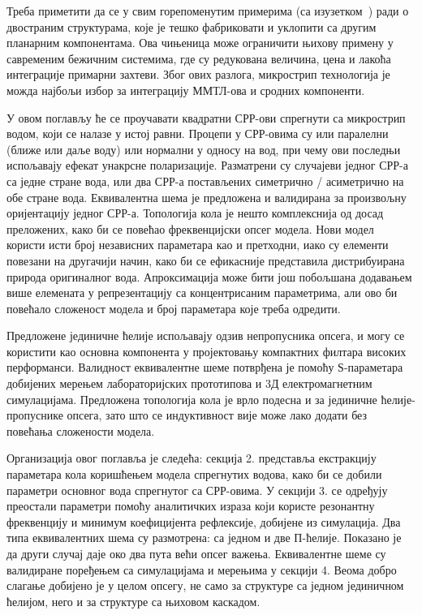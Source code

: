 Треба приметити да се у свим горепоменутим примерима (са изузетком~\cite{bib16}) ради о двостраним структурама, које је тешко фабриковати и уклопити са другим планарним компонентама. Ова чињеница може ограничити њихову примену у савременим бежичним системима, где су редукована величина, цена и лакоћа интеграције примарни захтеви. Због ових разлога, микрострип технологија је можда најбољи избор за интеграцију ММТЛ-ова и сродних компоненти.

У овом поглављу ће се проучавати квадратни СРР-ови спрегнути са микрострип водом, који се налазе у истој равни. Процепи у СРР-овима су или паралелни (ближе или даље воду) или нормални у односу на вод, при чему ови последњи испољавају ефекат унакрсне поларизације. Разматрени су случајеви једног СРР-а са једне стране вода, или два СРР-а постављених симетрично / асиметрично на обе стране вода. Еквивалентна шема је предложена и валидирана за произвољну оријентацију једног СРР-а. Топологија кола је нешто комплекснија од досад преложених, како би се повећао фреквенцијски опсег модела. Нови модел користи исти број независних параметара као и претходни, иако су елементи повезани на другачији начин, како би се ефикасније представила дистрибуирана природа оригиналног вода. Апроксимација може бити још побољшана додавањем више елемената у репрезентацију са концентрисаним параметрима, али ово би повећало сложеност модела и број параметара које треба одредити.

Предложене јединичне ћелије испољавају одзив непропусника опсега, и могу се користити као основна компонента у пројектовању компактних филтара високих перформанси. Валидност еквивалентне шеме потврђена је помоћу $Ѕ$-параметара добијених мерењем лабораторијских прототипова и 3Д електромагнетним симулацијама. Предложена топологија кола је врло подесна и за јединичне ћелије-пропуснике опсега, зато што се индуктивност вије може лако додати без повећања сложености модела.

Организација овог поглавља је следећа: секција 2. представља екстракцију параметара кола коришћењем модела спрегнутих водова, како би се добили параметри основног вода спрегнутог са СРР-овима. У секцији 3. се одређују преостали параметри помоћу аналитичких израза који користе резонантну фреквенцију и минимум коефицијента рефлексије, добијене из симулација. Два типа еквивалентних шема су размотрена: са једном и две П-ћелије. Показано је да други случај даје око два пута већи опсег важења. Еквивалентне шеме су валидиране поређењем са симулацијама и мерењима у секцији 4. Веома добро слагање добијено је у целом опсегу, не само за структуре са једном јединичном ћелијом, него и за структуре са њиховом каскадом.

